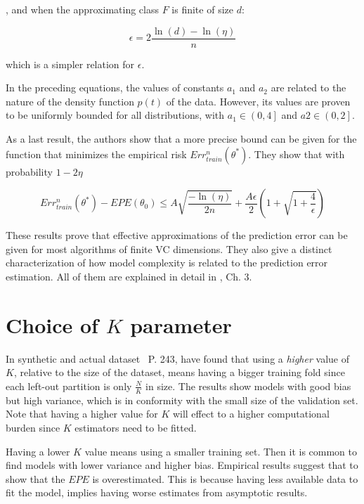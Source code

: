 , and when the approximating class $F$ is finite of size $d$:

\begin{equation}
\epsilon = 2 \frac{ \ln(d) - \ln(\eta)}{n}
\end{equation}\label{eq:vapnik-epsilonBoundSimple}


which is a simpler relation for $\epsilon$.

In the preceding equations, the values of constants $a_1$ and $a_2$ are related to the nature of the density function $p(t)$ of the data.
However, its values are proven to be uniformly bounded for all distributions, with $a_1 \in {\left(0,4 \right] }$ and $a2 \in {\left(0,2 \right]}$.

As a last result, the authors show that a more precise bound can be given for the function that minimizes the empirical risk $Err^n_{train}(\theta^*)$.
They show that with probability $1 - 2\eta$

\begin{equation}
Err^n_{train}(\theta^*) - EPE(\theta_0) \leq A \sqrt{\frac{-\ln(\eta)}{2n} } + \frac{A \epsilon}{2}\left( 1+ \sqrt{1 + \frac{4}{\epsilon} } \right)
\end{equation}\label{eq:vapnik-classificationBoundPrecise}

These results prove that effective approximations of the prediction error can be given for most algorithms of finite VC dimensions.
They also give a distinct characterization of how model complexity is related to the prediction error estimation.
All of them are explained in detail in \citep{vapnik-nature2000}, Ch. 3.



\section{Choice of \texorpdfstring{$K$ parameter}{Lg} }\label{appx:sec:optimalKfoldNumber}

In synthetic and actual dataset~\citep{hastie-elemstatslearn} P.
243, have found that using a \textit{higher} value of $K$, relative to the size of the dataset, means having a bigger training fold since each left-out partition is only $\frac{N}{K}$ in size.
The results show models with good bias but high variance, which is in conformity with the small size of the validation set.
Note that having a higher value for $K$ will effect to a higher computational burden since $K$ estimators need to be fitted.

Having a lower $K$ value means using a smaller training set.
Then it is common to find models with lower variance and higher bias.
Empirical results suggest that to show that the $EPE$ is overestimated.
This is because having less available data to fit the model, implies having worse estimates from asymptotic results.

